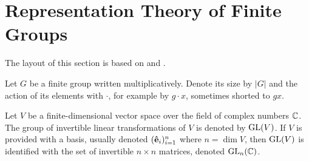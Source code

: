 \clearpage{\thispagestyle{empty}}
\section{Representation Theory of Finite Groups}

The layout of this section is based on \cite{FultonHarris} and \cite{Serre}.

Let $G$ be a finite group written multiplicatively. Denote its size by $|G|$ and the action of its elements with $\cdot$, for example by $g \cdot x$, sometimes shorted to $gx$.

Let $V$ be a finite-dimensional vector space over the field of complex numbers $\mathbb{C}$. The group of invertible linear transformations of $V$ is denoted by $\text{GL}(V)$. If $V$ is provided with a basis, usually denoted $(\mathbf{\hat{e}}_i)_{i=1}^n$ where $n = \dim V$, then $\text{GL}(V)$ is identified with the set of invertible $n \times n$ matrices, denoted $\text{GL}_n(\mathbb{C})$\cite[18.1]{DummitFoote}.

